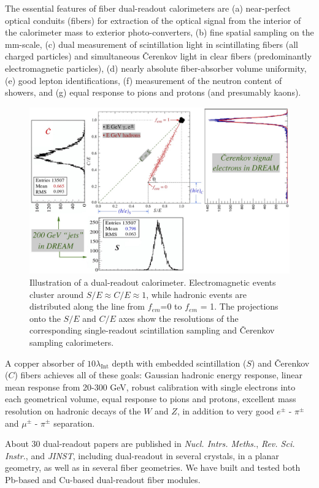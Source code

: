 The essential features of  fiber dual-readout calorimeters are (a) near-perfect optical conduits (fib\-ers)
for extraction of the optical signal from the interior of the calorimeter mass to exterior photo-convert\-ers, 
(b) fine spatial sampling on the mm-scale, (c) dual measurement of scintillation light in scintillating
fibers (all charged particles) and simultaneous \v{C}er\-enk\-ov light in clear fibers (predominantly electromagnetic
particles), (d) nearly absolute fiber-absorber volume uniformity, (e) good lepton identifications, (f) measurement of the neutron content of showers, and (g) equal response to pions and protons (and presumably kaons).

\begin{figure}
  \centering
  \includegraphics[width=.7\linewidth]{Calorimeter/DualReadout/groom-plot-projs.jpg}
   \caption{Illustration of a dual-readout calorimeter.  Electromagnetic events cluster around $S/E\approx C/E \approx 1$,
   while hadronic events are distributed along the line from $f_{em}$=0 to $f_{em}$ = 1.  The projections onto the $S/E$ and $C/E$
   axes show the resolutions of the corresponding single-readout scintillation sampling and \v{C}er\-enk\-ov sampling calorimeters.}  
   \label{fig:groom}
 \end{figure}
 
 A copper absorber of $10 \lambda_{\text{Int}}$ depth with embedded scintillation ($S$) and \v{C}er\-enk\-ov ($C$) fibers achieves
 all of these goals:  Gaussian hadronic energy response,  linear mean response from 20-300 GeV, 
  robust calibration with single electrons into each geometrical volume, 
  equal response to pions and protons, 
  excellent mass resolution on hadronic decays of the $W$ and $Z$,
  in addition to very good $e^{\pm}$ -  $\pi^{\pm}$  and  $\mu^{\pm}$ -  $\pi^{\pm}$ separation.  
  
About 30 dual-readout papers are published in {\it Nucl. Intrs. Meths.}, {\it Rev. Sci. Instr.}, and {\it JINST}, including
dual-readout in several crystals, in a planar geometry, as well as in several fiber geometries. We have built
and tested both Pb-based and Cu-based dual-readout fiber modules.   

